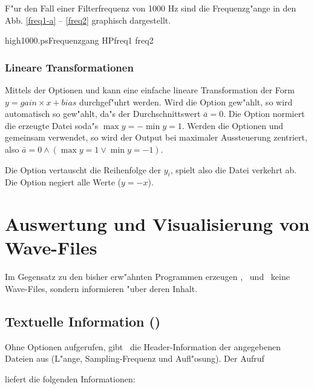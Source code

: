 F"ur den Fall einer Filterfrequenz von 1000 Hz sind die Frequenzg"ange
in den Abb. \ref{freq1-a} -- \ref{freq2} graphisch dargestellt.

       {high1000.ps}{Frequenzgang HP}{freq1}
       {freq2}

\subsubsection{Lineare Transformationen}

Mittels der Optionen  und  kann eine
einfache lineare Transformation der Form $y=gain \times x+ bias$
durchgef"uhrt werden. Wird die Option  gew"ahlt, so wird
 automatisch so gew"ahlt, da"s der
Durchschnittswert $\bar{a}=0$. Die Option  normiert die
erzeugte Datei soda"s $\max y = -\min y = 1$.
Werden die Optionen  und  gemeinsam verwendet,
so wird der Output bei maximaler Aussteuerung zentriert, also
$\bar{a} = 0 \wedge ( \max y = 1 \vee \min y = -1)$.

Die Option  vertauscht die Reihenfolge der $y_i$, spielt
also die Datei verkehrt ab. Die Option  negiert alle
Werte ($y = -x$).



\section{Auswertung und Visualisierung von Wave-Files}

Im Gegensatz zu den bisher erw"ahnten Programmen erzeugen
\winf, \wview\ und \wplot\ keine Wave-Files, sondern informieren
"uber deren Inhalt.


\subsection{Textuelle Information (\winf)}



Ohne Optionen aufgerufen, gibt \winf\ die Header-Information der
angegebenen Dateien aus (L"ange, Sampling-Frequenz und Aufl"osung).
Der Aufruf


\noindent liefert die folgenden Informationen:

